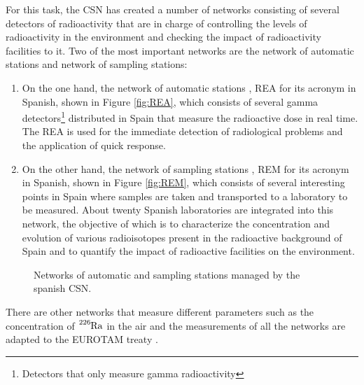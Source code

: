\begin{enumerate}
For this task, the CSN has created a number of networks consisting of several detectors of radioactivity that are in charge of controlling the levels of radioactivity in the environment and checking the impact of radioactivity facilities to it. Two of the most important networks are the network of automatic stations and network of sampling stations:

\begin{enumerate}
\item{} On the one hand, the network of automatic stations \cite{REA}, REA for its acronym in Spanish, shown in Figure \ref{fig:REA}, which consists of several gamma detectors\footnote{Detectors that only measure gamma radioactivity} distributed in Spain that measure the radioactive dose in real time. The REA is used for the immediate detection of radiological problems and the application of quick response.

\item{} On the other hand, the network of sampling stations \cite{REM}, REM for its acronym in Spanish, shown in Figure \ref{fig:REM}, which consists of several interesting points in Spain where samples are taken and transported to a laboratory to be measured. About twenty Spanish laboratories are integrated into this network, the objective of which is to characterize the concentration and evolution of various radioisotopes present in the radioactive background of Spain and to quantify the impact of radioactive facilities on the environment.
\end{enumerate}

\begin{figure}[hbtp]
 \centering
 \caption{Networks of automatic and sampling stations managed by the spanish CSN.}
 \label{fig:NetworksCSN}
\end{figure}

There are other networks that measure different parameters such as the concentration of $\ce{^{226}Ra}$ in the air and the measurements of all the networks are adapted to the EUROTAM treaty \cite{100BqL}.
\end{enumerate}

